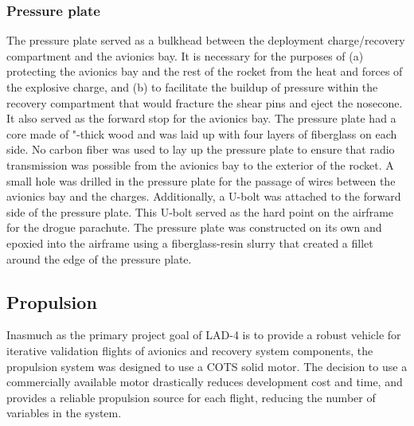 \subsubsection*{Pressure plate}
The pressure plate served as a bulkhead between the deployment charge/recovery compartment and the avionics bay. It is necessary for the purposes of (a) protecting the avionics bay and the rest of the rocket from the heat and forces of the explosive charge, and (b) to facilitate the buildup of pressure within the recovery compartment that would fracture the shear pins and eject the nosecone. It also served as the forward stop for the avionics bay. The pressure plate had a core made of "-thick wood and was laid up with four layers of fiberglass on each side. No carbon fiber was used to lay up the pressure plate to ensure that radio transmission was possible from the avionics bay to the exterior of the rocket. A small hole was drilled in the pressure plate for the passage of wires between the avionics bay and the charges. 
\newline\newline
Additionally, a U-bolt was attached to the forward side of the pressure plate. This U-bolt served as the hard point on the airframe for the drogue parachute. The pressure plate was constructed on its own and epoxied into the airframe using a fiberglass-resin slurry that created a fillet around the edge of the pressure plate.
\subsection{Propulsion}
Inasmuch as the primary project goal of LAD-4 is to provide a robust vehicle for iterative validation flights of avionics and recovery system components, the propulsion system was designed to use a COTS solid motor. The decision to use a commercially available motor drastically reduces development cost and time, and provides a reliable propulsion source for each flight, reducing the number of variables in the system. 
